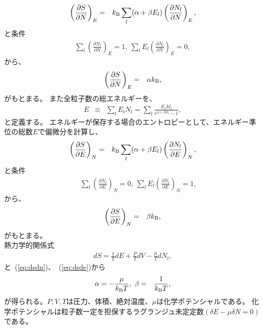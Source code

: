 \documentclass[12pt,a4paper]{jbook}
\newcommand{\kb} {k_{\rm B}}				%
\begin{document}
		\begin{eqnarray}
			\left( \frac{\partial S}{\partial N} \right)_E & = &
			\kb \sum_l (\alpha + \beta E_l) \left( \frac{\partial N_l}{\partial N} \right)_E,
		\end{eqnarray}
        	と条件
		\begin{eqnarray}
			\sum_l \left( \frac{\partial N_l}{\partial N} \right)_E = 1,
			\ \sum_l E_l \left( \frac{\partial N_l}{\partial N} \right)_E = 0,
		\end{eqnarray}
       		から、
		\begin{eqnarray}
            	\label{eq:dsdn}
			\left( \frac{\partial S}{\partial N} \right)_E & = & \alpha \kb,
		\end{eqnarray}
        	がもとまる。
        	また全粒子数の総エネルギーを、
		\begin{eqnarray}
			E & \equiv & \sum_l E_l N_l = \sum_l \frac{E_l M_l}{e^{\alpha + \beta E_l} -1},
		\end{eqnarray}
        	と定義する。
        	エネルギーが保存する場合のエントロピーとして、エネルギー準位の総数$E$で偏微分を計算し、
		\begin{eqnarray}
			\left( \frac{\partial S}{\partial E} \right)_N & = &
			\kb \sum_l (\alpha + \beta E_l) \left( \frac{\partial N_l}{\partial E} \right)_N,
		\end{eqnarray}
        	と条件
		\begin{eqnarray}
			& & \sum_l \left( \frac{\partial N_l}{\partial E} \right)_N = 0,
			\ \sum_l E_l \left( \frac{\partial N_l}{\partial E} \right)_N = 1,
		\end{eqnarray}
        	から、
		\begin{eqnarray}
            	\label{eq:dsde}
			\left( \frac{\partial S}{\partial E} \right)_N & = & \beta \kb,
		\end{eqnarray}
        	がもとまる。
        	\\
        	熱力学的関係式
        	\begin{eqnarray}
        		dS = \frac{1}{T}dE + \frac{P}{T}dV - \frac{\mu}{T} dN_l,
        	\end{eqnarray}
        	と~(\ref{eq:dsdn})、~(\ref{eq:dsde})から
		\begin{eqnarray}
            	\label{eq:alphabeta}
			\alpha = - \frac{\mu}{{\kb} T}
			, \ \beta & = & \frac{1}{{\kb} T},
		\end{eqnarray}
        	が得られる。$P,V,T$は圧力、体積、絶対温度、$\mu$は化学ポテンシャルである。
        	化学ポテンシャルは粒子数一定を担保するラグランジュ未定定数$(\delta E - \mu \delta N = 0)$である。
\end{document}
